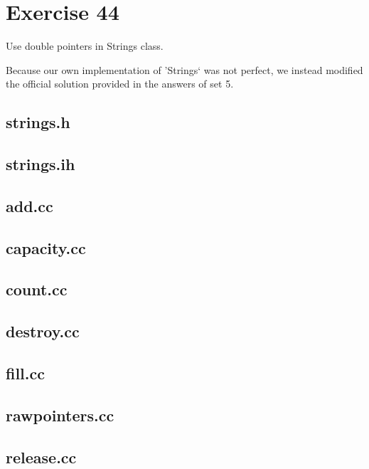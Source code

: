 \section{Exercise 44}
\begin{question}
    Use double pointers in Strings class.
\end{question}

\begin{solution}
    Because our own implementation of 'Strings` was not perfect, we instead modified the official solution provided in the answers of set 5. 



    \subsection{strings.h}
    \subsection{strings.ih}
    \subsection{add.cc}
    \subsection{capacity.cc}
    \subsection{count.cc}
    \subsection{destroy.cc}
    \subsection{fill.cc}
    \subsection{rawpointers.cc}
    \subsection{release.cc}

\end{solution}
